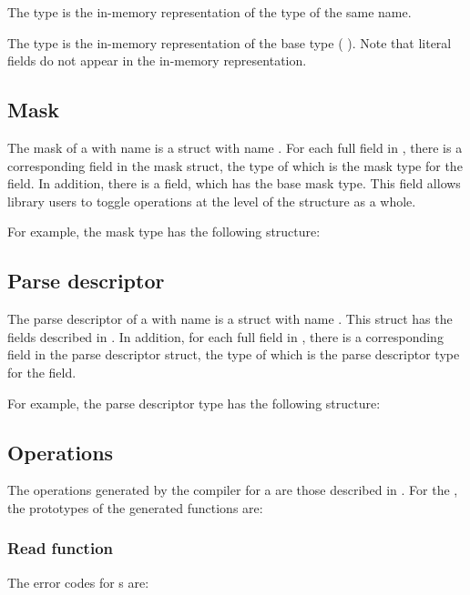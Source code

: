 The \C{} type  is the in-memory representation of
the \PADSL{} type of the same name.

The type  is the in-memory representation of the base
type  (\cf{} ).  Note that literal fields
do not appear in the in-memory representation. 

\subsection{Mask}
\label{sec:structs-masks}
The mask of a \Pstruct{} with name  is a \C{} struct 
with name .  For each full field in
, there is a corresponding field in the mask struct, the
type of which is the mask type for
the field.  In addition, there is a 
 field, which has the base mask type.  This field allows
library users to toggle operations at the level of the structure as a
whole. 

For example, the mask type  has the
following structure:


\subsection{Parse descriptor}
\label{sec:structs-parse-descriptors}
The parse descriptor of a \Pstruct{} with name  is a \C{}
struct with name .  This struct has the fields
described in . In addition, for
each full field in , there is a corresponding field in
the parse descriptor struct, the type of which is the parse descriptor
type for the field.

For example, the parse descriptor type  has
the following structure:

\subsection{Operations}
The operations generated by the \pads{} compiler for a \Pstruct{} are
those described in .  For the \Pstruct{}
, the prototypes of the generated functions are:


\subsubsection{Read function}
The error codes for \Pstruct{}s are:

